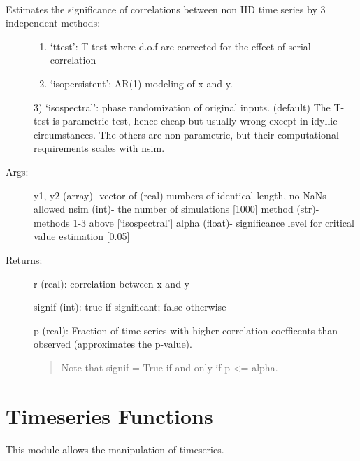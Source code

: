 \documentclass[letterpaper,10pt,english]{sphinxmanual}
\begin{document}
\begin{fulllineitems}
\label{\detokenize{Stats:pyleoclim.Stats.corrsig}}~\begin{description}
\item[{Estimates the significance of correlations between non IID time series by 3 independent methods:}] \leavevmode\begin{enumerate}
\item {} 
‘ttest’: T-test where d.o.f are corrected for the effect of serial correlation

\item {} 
‘isopersistent’: AR(1) modeling of x and y.

\end{enumerate}

3) ‘isospectral’: phase randomization of original inputs. (default)
The T-test is parametric test, hence cheap but usually wrong except in idyllic circumstances.
The others are non-parametric, but their computational requirements scales with nsim.

\item[{Args:}] \leavevmode
y1, y2 (array)- vector of (real) numbers of identical length, no NaNs allowed
nsim (int)- the number of simulations {[}1000{]}
method (str)- methods 1-3 above {[}‘isospectral’{]}
alpha (float)- significance level for critical value estimation {[}0.05{]}

\item[{Returns:}] \leavevmode
r (real): correlation between x and y

signif (int): true  if significant; false otherwise

p (real): Fraction of time series with higher correlation coefficents than observed (approximates the p-value).
\begin{quote}

Note that signif = True if and only if p \textless{}= alpha.
\end{quote}

\end{description}

\end{fulllineitems}



\chapter{Timeseries Functions}
\label{\detokenize{Timeseries:timeseries-functions}}\label{\detokenize{Timeseries::doc}}
This module allows the manipulation of timeseries.
\end{document}
